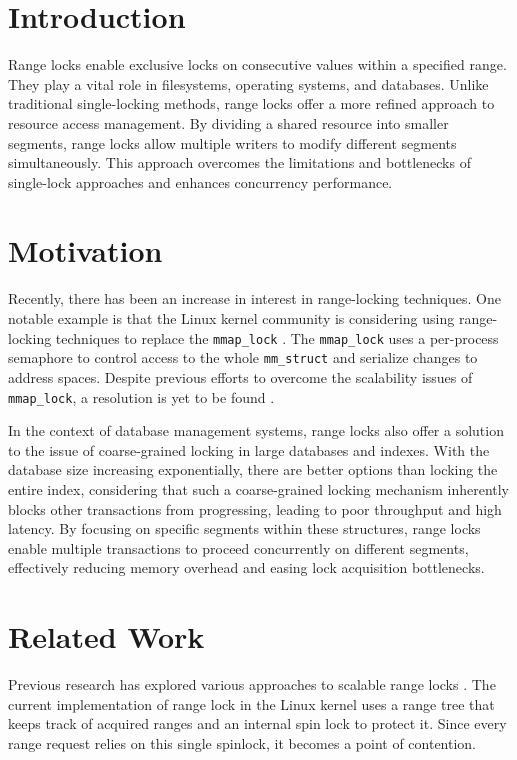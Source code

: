 \section{Introduction}

 Range locks enable exclusive locks on consecutive values within a specified range. They play a vital role in filesystems, operating systems, and databases\parencite{readerWriterLocks2017, graefe2007hierarchical, lee2021concurrent}. Unlike traditional single-locking methods, range locks offer a more refined approach to resource access management. By dividing a shared resource into smaller segments, range locks allow multiple writers to modify different segments simultaneously. This approach overcomes the limitations and bottlenecks of single-lock approaches and enhances concurrency performance.

\section{Motivation}
Recently, there has been an increase in interest in range-locking techniques. One notable example is that the Linux kernel community is considering using range-locking techniques to replace the \texttt{mmap\_lock} \parencite{readerWriterLocks2017, mapleTree2021, mmapLock2022}. The \texttt{mmap\_lock} uses a per-process semaphore to control access to the whole \texttt{mm\_struct} \parencite{mmstruct2023} and serialize changes to address spaces.  Despite previous efforts to overcome the scalability issues of \texttt{mmap\_lock}, a resolution is yet to be found \parencite{mmapLock2022}.

In the context of database management systems, range locks also offer a solution to the issue of coarse-grained locking in large databases and indexes. With the database size increasing exponentially, there are better options than locking the entire index, considering that such a coarse-grained locking mechanism inherently blocks other transactions from progressing, leading to poor throughput and high latency. By focusing on specific segments within these structures, range locks enable multiple transactions to proceed concurrently on different segments, effectively reducing memory overhead and easing lock acquisition bottlenecks\parencite{graefe2007hierarchical}.

\section{Related Work}
Previous research has explored various approaches to scalable range locks \parencite{linuxRangeLockImpl2013, song2013parallelizing, kogan2020scalable}. The current implementation of range lock in the Linux kernel uses a range tree that keeps track of acquired ranges and an internal spin lock to protect it\parencite{linuxRangeLockImpl2013}. Since every range request relies on this single spinlock, it becomes a point of contention. 

